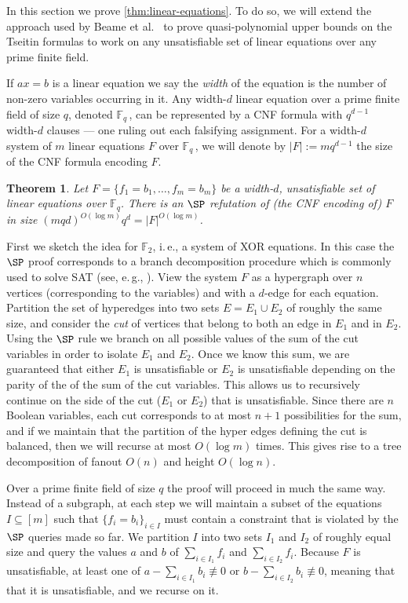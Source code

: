 \documentclass[11pt]{article}
\numberwithin{equation}{section}
\newtheorem{theorem}{Theorem}[section]
\theoremstyle{definition}
\theoremstyle{plain}
\newcommand{\ie}{i.\,e.}
\newcommand{\eg}{e.\,g.}
\newcounter{cor}\renewcommand{\thecor}{1.1.\arabic{cor}}\newenvironment{cor}{\ifnum\value{cor}=0\refstepcounter{cor}\else\PackageError{toc-native-compat}{Unsupported additional cor envelope}{Only the one exact source-observed cor paragraph is allowed.}\fi}{}\providecommand{\corautorefname}{Theorem}
\begin{document}
In this section we prove \autoref{thm:linear-equations}. 
To do so, we will extend the approach used by Beame et al.~\cite{BeameFIKPPR18} to prove quasi-polynomial upper bounds on the Tseitin formulas to work on any unsatisfiable set of linear equations over any prime finite field. 

If $ax = b$ is a linear equation we say the \emph{width} of the equation is the number of non-zero variables occurring in it.
Any width-$d$ linear equation over a prime finite field of size $q$, denoted $\mathbb{F}_q\,$, can be represented by a CNF formula with $q^{d-1}$ width-$d$ clauses --- one ruling out each falsifying assignment.
For a width-$d$ system of $m$ linear equations $F$ over $\mathbb{F}_q\,$, we will denote by $|F| := mq^{d-1}$ the size of the CNF formula encoding $F$. 

\begin{theorem}\label{thm:SP_gaussian_elim}
	Let $F = \{f_1 = b_1, \ldots, f_m = b_m \}$ be a width-$d$, unsatisfiable set of linear equations over $\mathbb{F}_q$.
	There is an $\SP$ refutation of (the CNF encoding of) $F$ in size $(mqd)^{O(\log m)}q^d = |F|^{O(\log m)}$.
\end{theorem}

First we sketch the idea for $\mathbb{F}_2$, \ie,  a system of XOR equations.
In this case the $\SP$ proof corresponds to a branch decomposition procedure which is commonly used to solve SAT (see, \eg, \cite{LodhaOS19,AlekhnovichR02,Dechter96,Darwiche01}). 
View the system $F$ as a hypergraph over $n$ vertices (corresponding to the variables) and with a $d$-edge for each equation. 
Partition the set of hyperedges into two sets $E = E_1 \cup E_2$ of roughly the same size, and consider the \emph{cut} of vertices that belong to both an edge in $E_1$ and in $E_2$. 
Using the $\SP$ rule we branch on all possible values of the sum of the cut variables in order to isolate $E_1$ and $E_2$. 
Once we know this sum, we are guaranteed that either $E_1$ is unsatisfiable or $E_2$ is unsatisfiable depending on the parity of the of the sum of the cut variables. 
This allows us to recursively continue on the side of the cut ($E_1$ or $E_2$) that is unsatisfiable. 
Since there are $n$ Boolean variables, each cut corresponds to at most $n+1$ possibilities for the sum, and if we maintain that the partition of the hyper edges defining the cut is balanced, then we will recurse at most $O(\log m)$ times. 
This gives rise to a tree decomposition of fanout $O(n)$ and height $O(\log n)$.

Over a prime finite field of size $q$ the proof will proceed in much the same way. 
Instead of a subgraph, at each step we will maintain a subset of the equations $I \subseteq [m]$ such that $\{f_i =b_i \}_{i \in I}$ must contain a constraint that is violated by the $\SP$ queries made so far. We partition $I$ into two sets $I_1$ and $I_2$ of roughly equal size and query the values $a$ and $b$ of $\sum_{i \in I_1} f_i$ and $\sum_{i \in I_2} f_i$. Because $F$ is unsatisfiable, at least one of $a- \sum_{i \in I_1} b_i \not \equiv 0$ or $b- \sum_{i \in I_2} b_i \not \equiv 0$, meaning that that it is unsatisfiable, and we recurse on it. 
\end{document}
